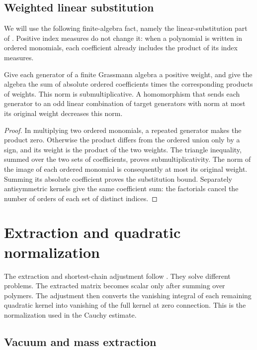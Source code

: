 \subsection{Weighted linear substitution}

We will use the following finite-algebra fact, namely the
linear-substitution part of
\cite[Proposition~11.4]{QED3Manuscript}. Positive index measures
do not change it: when a polynomial is written in ordered
monomials, each coefficient already includes the product of its
index measures.

\begin{lemma}\label{lem:linear-substitution}
Give each generator of a finite Grassmann algebra a positive
weight, and give the algebra the sum of absolute ordered
coefficients times the corresponding products of weights.
This norm is submultiplicative. A homomorphism that sends each
generator to an odd linear combination of target generators
with norm at most its original weight decreases this norm.
\end{lemma}

\begin{proof}
In multiplying two ordered monomials, a repeated generator makes
the product zero. Otherwise the product differs from the ordered
union only by a sign, and its weight is the product of the two
weights. The triangle inequality, summed over the two sets of
coefficients, proves submultiplicativity. The norm of the image
of each ordered monomial is consequently at most its original
weight. Summing its absolute coefficient proves the
substitution bound. Separately antisymmetric kernels give the
same coefficient sum: the factorials cancel the number of
orders of each set of distinct indices.
\end{proof}
\section{Extraction and quadratic normalization}
\label{sec:extraction}

The extraction and shortest-chain adjustment follow
\cite[\S\S12.3,12.5]{QED3Manuscript}. They solve different problems.
The extracted matrix becomes scalar only after summing over polymers.
The adjustment then converts the vanishing integral of each remaining
quadratic kernel into vanishing of the full kernel at zero connection.
This is the normalization used in the Cauchy estimate.

\subsection{Vacuum and mass extraction}
\label{subsec:rg-extraction}

